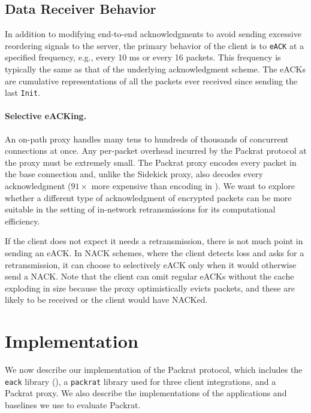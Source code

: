 \subsection{Data Receiver Behavior}

In addition to modifying end-to-end acknowledgments to avoid sending excessive
reordering signals to the server, the primary behavior of the client is
to \texttt{eACK} at a specified frequency, e.g., every 10 ms or every 16
packets. This frequency is typically the same as that of the underlying
acknowledgment scheme. The eACKs are cumulative representations of all the
packets ever received since sending the last \texttt{Init}.

\paragraph{Selective eACKing.}

An on-path proxy handles many tens to hundreds of thousands of concurrent
connections at once. Any per-packet overhead incurred by the Packrat protocol
at the proxy must be extremely small. The Packrat proxy encodes every packet in
the base connection and, unlike the Sidekick proxy, also decodes every
acknowledgment ($91\!\times$ more expensive than encoding in \cite
{yuan2024sidekick}). We want to explore whether a different type of
acknowledgment of encrypted packets can be more suitable in the setting of
in-network retransmissions for its computational efficiency.

If the client does not expect it needs a retransmission, there is not much point
in sending an eACK. In NACK schemes, where the client detects loss and asks for
a retransmission, it can choose to selectively eACK only when it would
otherwise send a NACK. Note that the client can omit regular eACKs without the
cache exploding in size because the proxy optimistically evicts packets, and
these are likely to be received or the client would have NACKed.\\

\section{Implementation}

We now describe our implementation of the Packrat protocol, which includes
the \texttt{eack} library (),
a \texttt{packrat} library used for three client integrations,
and a Packrat proxy. We also describe the implementations of the
applications and baselines we use to evaluate Packrat.


